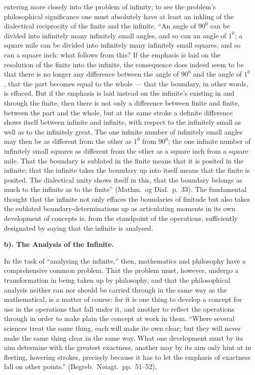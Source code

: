 \documentclass[12pt,a4paper]{book}
\begin{document}
entering more closely into the problem of infinity; to see the problem's
philosophical significance one must absolutely have at least an inkling of the
dialectical reciprocity of the finite and the
infinite. ``An angle of $90^{0}$ can be divided into infinitely many infinitely
small angles, and so can an angle of $1^{0}$; a square mile can be divided into
infinitely many infinitely small squares, and so can a square inch: what
follows from this? If the emphasis is laid on the resolution of the finite into
the infinite, the consequence does indeed seem to be that there is no longer
any difference between the angle of $90^{0}$ and the angle of $1^{0}$, that the
part becomes equal to the whole --- that the boundary, in other words, is
effaced. But if the emphasis is laid instead on the infinite's existing in and
through the finite, then there is not only a difference between finite and
finite, between the part and the whole, but at the same stroke a definite
difference shows itself between infinite and infinite, with respect to the
infinitely small as well as to the infinitely great. The one infinite number of
infinitely small angles may then be as different from the other as $1^{0}$ from
$90^{0}$; the one infinite number of infinitely small squares as different from
the other as a square inch from a square mile. That the boundary is sublated in
the finite means that it is posited in the infinite; that the infinite takes
the boundary up into itself means that the finite is posited. The dialectical
unity shows itself in this, that the boundary belongs as much to the infinite
as to the finite'' (Mathm.\ og Dial.\ p.~33). The fundamental thought that the
infinite not only effaces the boundaries of finitude but also takes the
sublated boundary-determinations up as articulating moments in its own
development of concepts is, from the standpoint of the operations, sufficiently
designated by saying that the infinite is analysed.

\textbf{b). The Analysis of the Infinite.}
In the task of ``analysing the infinite,'' then, mathematics and philosophy
have a comprehensive common problem. That the problem must, however, undergo a
transformation in being taken up by philosophy, and that the philosophical
analysis
neither can nor should be carried through in the same way as the mathematical,
is a matter of course: for it is one thing to develop a concept for use in the
operations that fall under it, and another to reflect the operations through in
order to make plain the concept at work in them. ``Where several sciences treat
the same thing, each will make its own clear; but they will never make the same
thing clear in the same way. What one development must by its aim determine
with the greatest exactness, another may by its aim only hint at in fleeting,
hovering strokes, precisely because it has to let the emphasis of exactness
fall on other points.'' (Begreb.\ Nøiagt.\ pp.~51--52).
\end{document}
